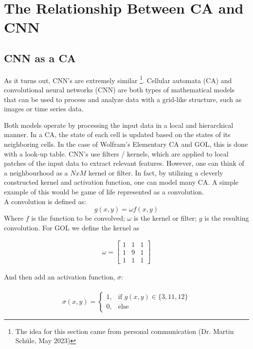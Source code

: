 \section{The Relationship Between CA and CNN}
\label{ca-cnn}
\subsection{CNN as a CA}
As it turns out, CNN's are extremely similar \footnote{The idea for this section came from personal communication (Dr. Martin Schüle, May 2023)}. Cellular automata (CA) and convolutional neural networks (CNN) are both types of mathematical models that can be used to process and analyze data with a grid-like structure, such as images or time series data. \cite{PhysRevE.100.032402}

Both models operate by processing the input data in a local and hierarchical manner. In a CA, the state of each cell is updated based on the states of its neighboring cells. In the case of Wolfram's Elementary CA and GOL, this is done with a look-up table. CNN's use filters / kernels, which are applied to local patches of the input data to extract relevant features. However, one can think of a neighbourhood as a $NxM$ kernel or filter. In fact, by utilizing a cleverly constructed kernel and activation function, one can model many CA. A simple example of this would be game of life represented as a convolution. \\

A convolution is defined as: \\

\begin{equation*}
	g(x,y) = \omega f(x, y)
\end{equation*}
Where $f$ is the function to be convolved; $\omega$ is the kernel or filter; $g$ is the resulting convolution. For GOL we define the kernel as

\begin{gather*}
	\omega = 
	\begin{bmatrix}
		1 & 1 & 1 \\
		1 & 9 & 1 \\
		1 & 1 & 1
	\end{bmatrix}
\end{gather*}


And then add an activation function, $\sigma$: \\ \\

\begin{equation}
	\sigma(x, y) = \begin{cases}
		1, & \text{if } g(x, y) \in \{3, 11, 12\} \\
		0, & \text{else}
	\end{cases}
\end{equation}

